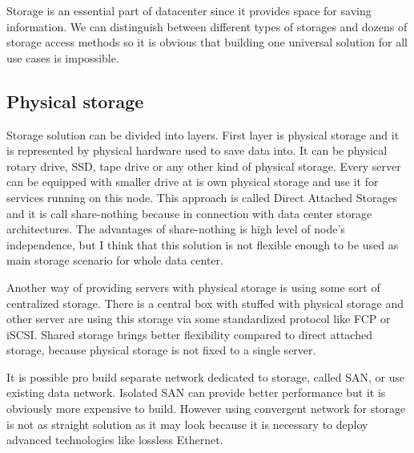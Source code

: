 

Storage is an essential part of datacenter since it provides space for saving information. We can distinguish between different types of storages and dozens of storage access methods so it is obvious that building one universal solution for all use cases is impossible. 

\subsection{Physical storage}
Storage solution can be divided into layers. First layer is physical storage and it is represented by physical hardware used to save data into. It can be physical rotary drive, \Ac{SSD}, tape drive or any other kind of physical storage. Every server can be equipped with smaller drive at is own physical storage and use it for services running on this node. This approach is called Direct Attached Storages and it is call share-nothing because in connection with data center storage architectures. The advantages of share-nothing is high level of node's independence, but I think that this solution is not flexible enough to be used as main storage scenario for whole data center.

Another way of providing servers with physical storage is using some sort of centralized storage. There is a central box with stuffed with physical storage and other server are using this storage via some standardized protocol like \Ac{FCP} or \Ac{iSCSI}. Shared storage brings better flexibility compared to direct attached storage, because physical storage is not fixed to a single server. 

It is possible pro build separate network dedicated to storage, called \Ac{SAN}, or use existing data network. Isolated \Ac{SAN} can provide better performance but it is obviously more expensive to build. However using convergent network for storage is not as straight solution as it may look because it is necessary to deploy advanced technologies like lossless Ethernet.

